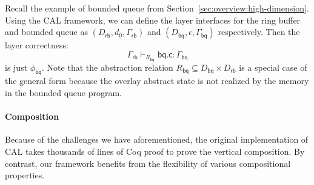 \documentclass[acmsmall,screen,review,anonymous]{acmart}
\newcommand{\kw}[1]{\ensuremath{ \mathsf{#1} }}
\begin{document}
\begin{example}
  Recall the example of bounded queue
  from Section~\ref{sec:overview:high-dimension}.
  Using the CAL framework,
  we can define the layer interfaces
  for the ring buffer and bounded queue as
  $(D_\kw{rb}, d_0, \Gamma_\kw{rb})$ and
  $(D_\kw{bq}, \epsilon, \Gamma_\kw{bq})$ respectively.
  Then the layer correctness:
  \[
    \Gamma_\kw{rb} \vdash_{R_\kw{bq}} \kw{bq.c} : \Gamma_\kw{bq}
  \]
  is just $\phi_\kw{bq}$.
  Note that the abstraction relation
  $R_\kw{bq} \subseteq D_\kw{bq} \times D_\kw{rb}$
  is a special case of the general form
  because the overlay abstract state
  is not realized
  by the memory in the bounded queue program.
\end{example}

\paragraph{Composition}
Because of the challenges
we have aforementioned,
the original implementation of CAL takes
thousands of lines of Coq proof
to prove the vertical composition.
By contrast,
our framework benefits from the flexibility
of various compositional properties.
\end{document}
